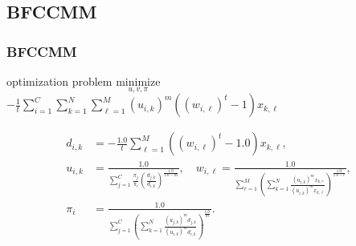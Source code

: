 \documentclass[fleqn,dvipdfmx,10pt]{beamer}
\begin{document}
\subsection{BFCCMM}
\begin{frame}\frametitle{BFCCMM}
  \begin{block}{optimization problem}
    $\underset{u,v,\pi}{\text{minimize}}$
    $-\frac{1}{t}\sum_{i=1}^C\sum_{k=1}^N\sum_{\ell=1}^M(u_{i,k})^m\left((w_{i,\ell})^t-1\right)x_{k,\ell}$
  \end{block}
  \begin{center}
    \begin{align*}
      d_{i,k}&=-\frac{1.0}{t}\sum_{\ell=1}^M\left((w_{i,\ell})^{t}-1.0\right)x_{k,\ell},\\
      u_{i,k}&=\frac{1.0}{\sum_{j=1}^C\frac{\pi_{j}}{\pi_{i}}\left(\frac{d_{j,k}}{d_{i,k}}\right)^\frac{1.0}{1.0-{m}}},\quad
      w_{i,\ell}=\frac{1.0}{\sum_{r=1}^M\left(\sum_{k=1}^N\frac{(u_{i,k})^m x_{k,r}}{(u_{i,k})^m x_{k,\ell}}\right)^{\frac{1.0}{1.0-t}}},\\
      \pi_{i}&=\frac{1.0}{\sum_{j=1}^C\left(\sum_{k=1}^N\frac{(u_{j,k})^{m}d_{j,k}}{(u_{i,k})^{m}d_{i,k}}\right)^{\frac{1.0}{m}}}.\\
    \end{align*}
  \end{center}
\end{frame}
\end{document}
